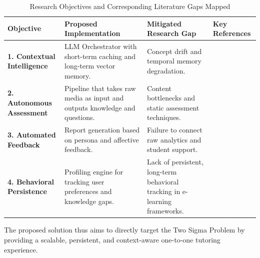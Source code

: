 \begin{table}[htbp]
	\centering
	\caption{Research Objectives and Corresponding Literature Gaps Mapped}
	\label{tab:gap_mapping}
	\begin{tabularx}{\textwidth}{@{} l X X l @{}}
		\toprule
		\textbf{Objective} & \textbf{Proposed Implementation} & \textbf{Mitigated Research Gap} & \textbf{Key References} \\ \midrule
		\textbf{1. Contextual Intelligence} & LLM Orchestrator with short-term caching and long-term vector memory. & Concept drift and temporal memory degradation. & \cite{hajmohammed2025, zakaria2025} \\ \addlinespace
		\textbf{2. Autonomous Assessment} & Pipeline that takes raw media as input and outputs knowledge and questions. & Content bottlenecks and static assessment techniques. & \cite{zhang2025, pradeesh2025} \\ \addlinespace
		\textbf{3. Automated Feedback} & Report generation based on persona and affective feedback. & Failure to connect raw analytics and student support. & \cite{hasan2020, bakhouyi2025} \\ \addlinespace
        \textbf{4. Behavioral Persistence} & Profiling engine for tracking user preferences and knowledge gaps. & Lack of persistent, long-term behavioral tracking in e-learning frameworks. & \cite{vukovic2021, aderghal2025} \\ \bottomrule
	\end{tabularx}
\end{table}

The proposed solution thus aims to directly target the Two Sigma Problem by providing a scalable, persistent, and context-aware one-to-one tutoring experience.
